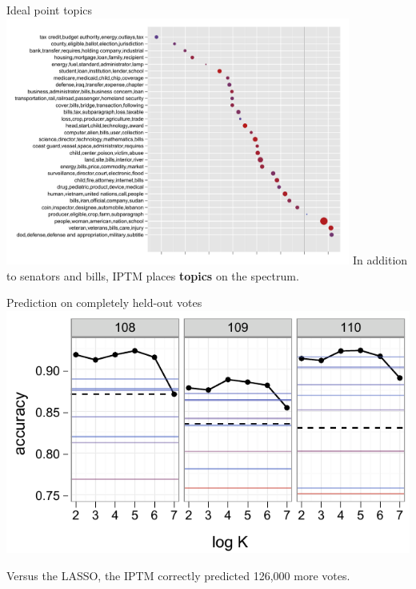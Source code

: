 \documentclass{beamer}
\begin{document}
\begin{frame}{Ideal point topics}
  \includegraphics[width=0.85\textwidth]{figs/ideal-point-topics.pdf}
  In addition to senators and bills, IPTM places \textbf{topics} on the spectrum.
\end{frame}

\begin{frame}{Prediction on completely held-out votes}
  \includegraphics[width=0.75 \textwidth]{figs/vote-accuracy.pdf}
  \begin{center}
    Versus the LASSO, the IPTM correctly predicted 126,000 more
    votes.
  \end{center}
\end{frame}
\end{document}

